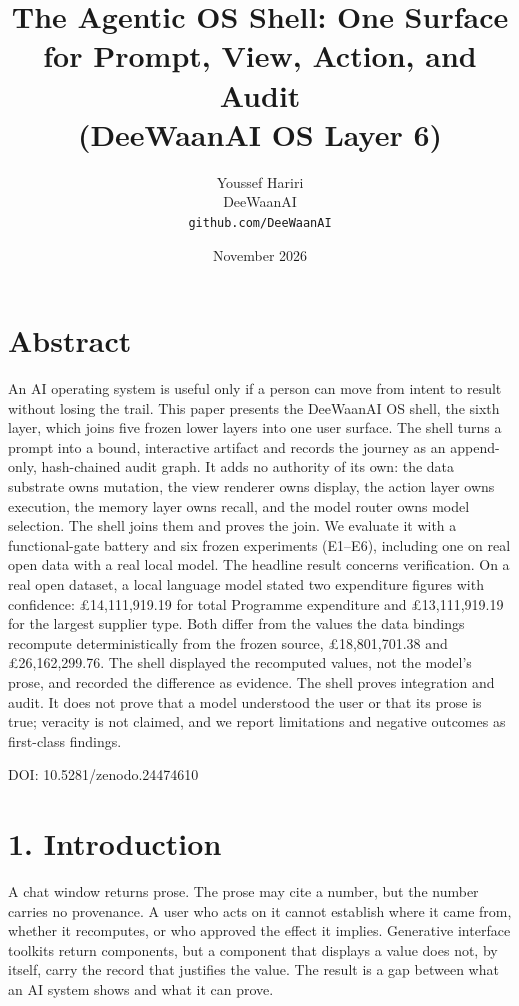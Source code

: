 \documentclass[11pt,a4paper]{article}
\title{\bfseries The Agentic OS Shell: One Surface for Prompt, View, Action, and Audit\\(DeeWaanAI OS Layer 6)}
\author{Youssef Hariri\\DeeWaanAI\\\texttt{github.com/DeeWaanAI}}
\date{November 2026}
\begin{document}
\maketitle

\section*{Abstract}
An AI operating system is useful only if a person can move from intent to result without losing the trail. This paper presents the DeeWaanAI OS shell, the sixth layer, which joins five frozen lower layers into one user surface. The shell turns a prompt into a bound, interactive artifact and records the journey as an append-only, hash-chained audit graph. It adds no authority of its own: the data substrate owns mutation, the view renderer owns display, the action layer owns execution, the memory layer owns recall, and the model router owns model selection. The shell joins them and proves the join. We evaluate it with a functional-gate battery and six frozen experiments (E1--E6), including one on real open data with a real local model. The headline result concerns verification. On a real open dataset, a local language model stated two expenditure figures with confidence: \pounds{}14,111,919.19 for total Programme expenditure and \pounds{}13,111,919.19 for the largest supplier type. Both differ from the values the data bindings recompute deterministically from the frozen source, \pounds{}18,801,701.38 and \pounds{}26,162,299.76. The shell displayed the recomputed values, not the model's prose, and recorded the difference as evidence. The shell proves integration and audit. It does not prove that a model understood the user or that its prose is true; veracity is not claimed, and we report limitations and negative outcomes as first-class findings.

DOI: 10.5281/zenodo.24474610

\section*{1. Introduction}
A chat window returns prose. The prose may cite a number, but the number carries no provenance. A user who acts on it cannot establish where it came from, whether it recomputes, or who approved the effect it implies. Generative interface toolkits return components, but a component that displays a value does not, by itself, carry the record that justifies the value. The result is a gap between what an AI system shows and what it can prove.
\end{document}

